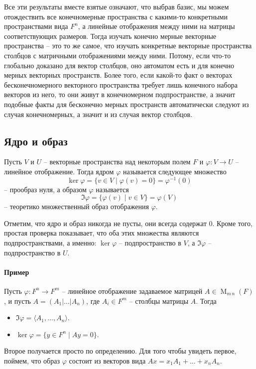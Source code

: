 Все эти результаты вместе взятые означают, что выбрав базис, мы можем отождествить все конечномерные пространства с какими-то конкретными пространствами вида $F^n$, а линейные отображения между ними на матрицы соответствующих размеров.
Тогда изучать конечно мерные векторные пространства -- это то же самое, что изучать конкретные векторные пространства столбцов с матричными отображениями между ними.
Потому, если что-то глобально доказано для вектор столбцов, оно автоматом есть и для конечно мерных векторных пространств.
Более того, если какой-то факт о векторах бесконечномерного векторного пространства требует лишь конечного набора векторов из него, то они живут в конечномерном подпространстве, а значит подобные факты для бесконечно мерных пространств автоматически следуют из случая конечномерных, а значит и из случая вектор столбцов.

\subsection{Ядро и образ}

\begin{definition}
Пусть $V$ и $U$ -- векторные пространства над некоторым полем $F$ и $\varphi\colon V\to U$ -- линейное отображение.
Тогда ядром $\varphi$ называется следующее множество
\[
\ker \varphi = \{v\in V \mid \varphi(v) = 0\} = \varphi^{-1}(0)
\]
-- прообраз нуля, а образом $\varphi$ называется
\[
\Im \varphi = \{\varphi(v)\mid v\in V\} = \varphi(V)
\]
-- теоретико множественный образ отображения $\varphi$.
\end{definition}

Отметим, что ядро и образ никогда не пусты, они всегда содержат $0$.
Кроме того, простая проверка показывает, что оба этих множества являются подпространствами, а именно: $\ker\varphi$ -- подпространство в $V$, а $\Im \varphi $ -- подпространство в $U$.

\paragraph{Пример}

Пусть $\varphi \colon F^n\to F^m$ -- линейное отображение задаваемое матрицей $A\in\operatorname{M}_{m\,n}(F)$, и пусть $A = (A_1|\ldots|A_n)$, где $A_i\in F^m$ -- столбцы матрицы $A$.
Тогда
\begin{itemize}
\item $\Im \varphi = \langle A_1,\ldots,A_n\rangle$.

\item $\ker \varphi = \{y\in F^n\mid Ay = 0\}$.
\end{itemize}
Второе получается просто по определению.
Для того чтобы увидеть первое, поймем, что образ $\varphi$ состоит из векторов вида $Ax = x_1 A_1 + \ldots + x_n A_n$.


